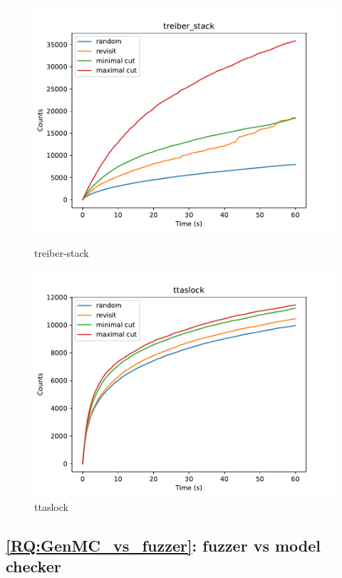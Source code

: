 \begin{figure}[h!]
	\begin{minipage}{0.45\textwidth}
		\centering
		\includegraphics[width=\textwidth]{figure/genmc-time/treiber_stack.pdf}
		\caption{treiber-stack}
		\label{genmc:treiber_stack-time}
	\end{minipage}
	\hfill
	\begin{minipage}{0.45\textwidth}
		\centering
		\includegraphics[width=\textwidth]{figure/genmc-time/ttaslock.pdf}
		\caption{ttaslock}
		\label{genmc:ttaslock-time}
	\end{minipage}
\end{figure}



\subsection{\ref*{RQ:GenMC_vs_fuzzer}: fuzzer vs model checker }

